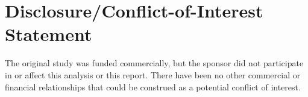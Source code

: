 \section*{Disclosure/Conflict-of-Interest Statement}
The original study was funded commercially, but the sponsor did not participate in or affect this analysis or this report. There have been no other commercial or financial relationships that could be construed as a potential conflict of interest. 